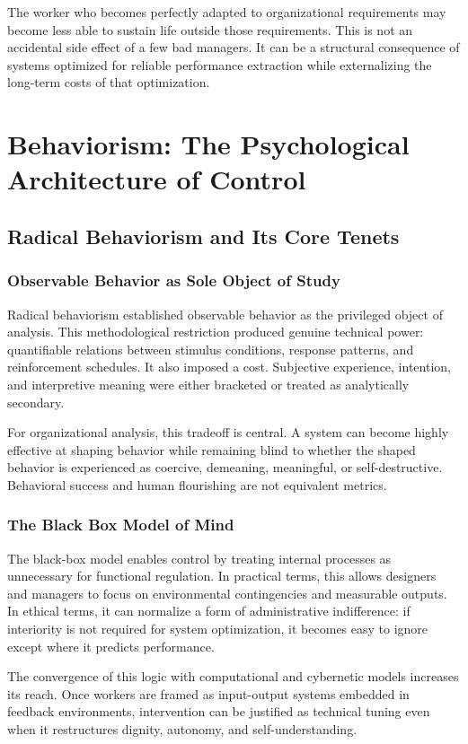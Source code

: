 \documentclass[11pt, a4paper]{article}
\begin{document}
The worker who becomes perfectly adapted to organizational requirements may become less able to sustain life outside those requirements. This is not an accidental side effect of a few bad managers. It can be a structural consequence of systems optimized for reliable performance extraction while externalizing the long-term costs of that optimization.

\section{Behaviorism: The Psychological Architecture of Control}

\subsection{Radical Behaviorism and Its Core Tenets}

\subsubsection{Observable Behavior as Sole Object of Study}
Radical behaviorism established observable behavior as the privileged object of analysis. This methodological restriction produced genuine technical power: quantifiable relations between stimulus conditions, response patterns, and reinforcement schedules. It also imposed a cost. Subjective experience, intention, and interpretive meaning were either bracketed or treated as analytically secondary.

For organizational analysis, this tradeoff is central. A system can become highly effective at shaping behavior while remaining blind to whether the shaped behavior is experienced as coercive, demeaning, meaningful, or self-destructive. Behavioral success and human flourishing are not equivalent metrics.

\subsubsection{The Black Box Model of Mind}
The black-box model enables control by treating internal processes as unnecessary for functional regulation. In practical terms, this allows designers and managers to focus on environmental contingencies and measurable outputs. In ethical terms, it can normalize a form of administrative indifference: if interiority is not required for system optimization, it becomes easy to ignore except where it predicts performance.

The convergence of this logic with computational and cybernetic models increases its reach. Once workers are framed as input-output systems embedded in feedback environments, intervention can be justified as technical tuning even when it restructures dignity, autonomy, and self-understanding.
\end{document}
